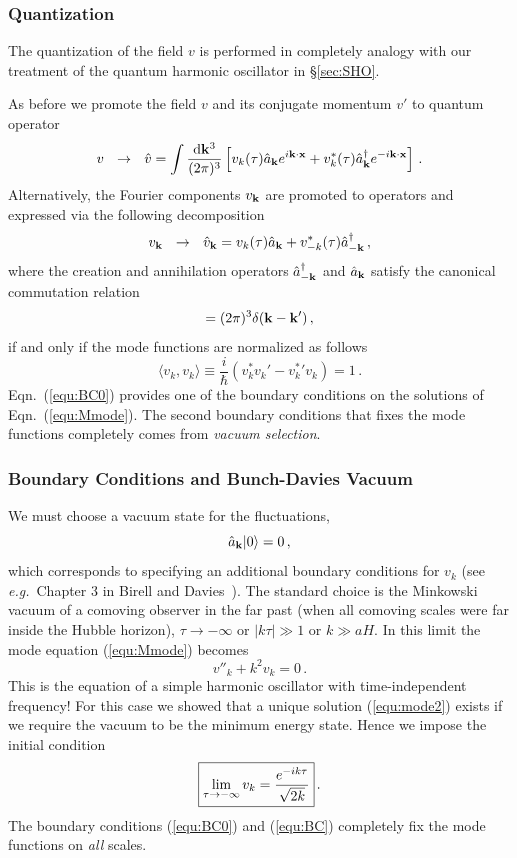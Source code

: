 \documentclass[12pt,letterpaper,rotate]{article}
\def\beq{\begin{equation}}
\def\eeq{\end{equation}}
\def\d{{\rm d}}
\newtheorem{thm}{Exercise}
\begin{document}
{\subsubsection{Quantization}

The quantization of the field $v$ is performed in completely analogy with our treatment of the quantum harmonic oscillator in \S\ref{sec:SHO}.

As before we promote the field $v$ and its conjugate momentum $v'$ to quantum operator
\beq
v \ \ \to \ \ \hat v = \int \frac{\d {\bf k}^3}{(2\pi)^3} \left[v_k(\tau) \hat a _{\bf k} e^{i {\bf k} \cdot {\bf x}} + v_k^*(\tau) \hat a _{\bf k}^\dagger e^{-i {\bf k} \cdot {\bf x}}\right]\, .
\eeq
Alternatively, the Fourier components $v_{\bf k}$ are promoted to operators and
expressed via the following decomposition
\beq
v_{\bf k} \ \ \to \ \ \hat v_{\bf k} = v_{k}(\tau) \hat a_{\bf k} + v_{-k}^*(\tau) \hat a^\dagger_{-\bf k}\, ,
\eeq
where the creation and annihilation operators $\hat a^\dagger_{-\bf k}$ and $\hat a_{ \bf k}$ satisfy the
canonical commutation relation
\beq
[\hat a_{\bf k}, \hat a^\dagger_{ {\bf k}'}] = (2\pi)^3 \delta({\bf k} - {\bf k}')\, ,
\eeq
if and only if the mode functions are normalized as follows
\beq
\label{equ:BC0}
\langle v_k , v_k \rangle \equiv \frac{i}{\hbar} (v_k^* v_k' -  v_k^*{}' v_k)= 1\, .
\eeq
Eqn.~(\ref{equ:BC0}) provides one of the boundary conditions on the solutions of Eqn.~(\ref{equ:Mmode}). The second boundary conditions that fixes the mode functions completely comes from {\it vacuum selection}.


\subsubsection{Boundary Conditions and Bunch-Davies Vacuum}

We must choose a vacuum state for the fluctuations,
\beq
\hat a_{\bf k} |0\rangle = 0\, ,
\eeq	
 which corresponds to specifying an additional boundary conditions for $v_k$ (see {\it e.g.}~Chapter 3 in Birell and Davies~\cite{BD}).
The standard choice is the Minkowski vacuum of a comoving observer in the far past (when all comoving scales were far inside the Hubble horizon), $\tau \to - \infty$ or $|k \tau| \gg 1$ or $k \gg a H$.
In this limit the mode equation (\ref{equ:Mmode}) becomes
\beq
v''_k + k^2 v_k = 0\, .
\eeq
This is the equation of a simple harmonic oscillator with time-independent frequency!
For this case we showed that a unique solution (\ref{equ:mode2}) exists if we require the vacuum to be the minimum energy state. Hence we impose the initial condition
\beq
\label{equ:BC}
\fbox{$\displaystyle
\lim_{\tau \to - \infty} v_k = \frac{e^{-i k \tau}}{\sqrt{2k}} $}\, .
\eeq
The boundary conditions (\ref{equ:BC0}) and (\ref{equ:BC}) completely fix the mode functions on {\it all} scales.

}
\end{document}
